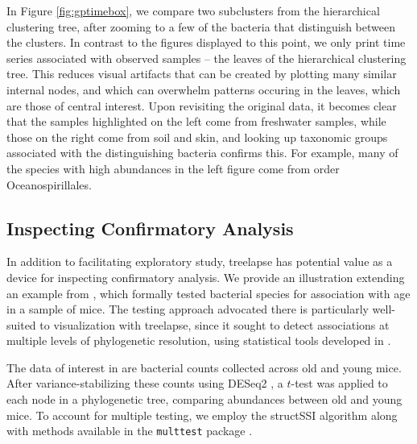 \documentclass[12pt]{article}
\begin{document}
In Figure \ref{fig:gptimebox}, we compare two subclusters from the
hierarchical clustering tree, after zooming to a few of the bacteria
that distinguish between the clusters. In contrast to the figures displayed to
this point, we only print time series associated with observed samples -- the
leaves of the hierarchical clustering tree. This reduces visual artifacts that
can be created by plotting many similar internal nodes, and which can overwhelm
patterns occuring in the leaves, which are those of central interest. Upon
revisiting the original data, it becomes clear that the samples highlighted on
the left come from freshwater samples, while those on the right come from soil
and skin, and looking up taxonomic groups associated with the distinguishing
bacteria confirms this. For example, many of the species with high
abundances in the left figure come from order Oceanospirillales.

\subsection{Inspecting Confirmatory Analysis}\label{structssi}

In addition to facilitating exploratory study, treelapse has potential
value as a device for inspecting confirmatory analysis. We provide an
illustration extending an example from \citep{callahan2016bioconductor}, which
formally tested bacterial species for association with age in a sample of mice.
The testing approach advocated there is particularly well-suited to
visualization with treelapse, since it sought to detect associations at multiple
levels of phylogenetic resolution, using statistical tools developed in
\citep{yekutieli2008hierarchical, sankaran2014structssi}.

The data of interest in \citep{callahan2016bioconductor} are bacterial counts
collected across old and young mice. After variance-stabilizing these counts
using DESeq2 \citep{love2014moderated}, a $t$-test was applied to each node in a
phylogenetic tree, comparing abundances between old and young mice. To account
for multiple testing, we employ the structSSI algorithm
\citep{yekutieli2008hierarchical, sankaran2014structssi} along with methods
available in the \texttt{multtest} package \citep{pollard2005multiple}.
\end{document}
